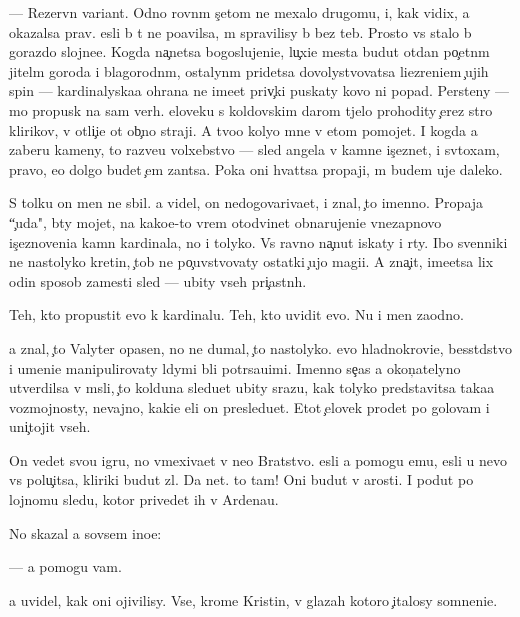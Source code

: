 \documentclass[10pt]{book}
\begin{document}
— Rezervn{\yi}{\y} variant. Odno rovn{\yi}m s{\c}etom ne mexalo drugomu, i, kak vidix, {\y}a okazalsa prav. {\Y}esli b{\yi} t{\yi} ne po{\y}avilsa, m{\yi} spravilisy b{\yi} bez teb{\ia}. Prosto vs{\e} stalo b{\yi} gorazdo slojne{\y}e. Kogda na{\c}netsa bogoslujeni{\y}e, lu{\c}xi{\y}e mesta budut otdan{\yi} po{\c}etn{\yi}m jitel{\ia}m goroda i blagorodn{\yi}m, ostalyn{\yi}m pridetsa dovolystvovatsa li{\q}ezreni{\y}em {\c}ujih spin — kardinalyska{\y}a ohrana ne ime{\y}et priv{\yi}{\c}ki puskaty kovo ni popad{\ia}. Persteny — mo{\y} propusk na sam{\yi}{\y} verh. {\C}eloveku s koldovskim darom t{\ia}jelo prohodity {\c}erez stro{\y} klirikov, v otli{\c}i{\y}e ot ob{\yi}{\c}no{\y} straji. A tvo{\y}o koly{\q}o mne v etom pomojet. I kogda {\y}a zaberu kameny, to razve{\y}u volxebstvo — sled angela v kamne is{\c}eznet, i sv{\ia}toxam, pravo, {\y}e{\x}o dolgo budet {\c}em zan{\ia}tsa. Poka oni hvat{\ia}tsa propaji, m{\yi} budem uje daleko.

S tolku on men{\ia} ne sbil. {\Y}a videl, on nedogovariva{\y}et, i znal, {\c}to imenno. Propaja ``{\c}uda", b{\yi}ty mojet, na kako{\y}e-to vrem{\ia} otodvinet obnarujeni{\y}e vnezapnovo is{\c}eznoveni{\y}a kamn{\ia} kardinala, no i tolyko. Vs{\e} ravno na{\c}nut iskaty i r{\yi}ty. Ibo sv{\ia}{\x}enniki ne nastolyko kretin{\yi}, {\c}tob{\yi} ne po{\c}uvstvovaty ostatki {\c}ujo{\y} magi{\y}i. A zna{\c}it, ime{\y}etsa lix odin sposob zamesti sled{\yi} — ubity vseh pri{\c}astn{\yi}h.

Teh, kto propustit {\y}evo k kardinalu. Teh, kto uvidit {\y}evo. Nu i men{\ia} zaodno.

{\Y}a znal, {\c}to Valyter opasen, no ne dumal, {\c}to nastolyko. {\Y}evo hladnokrovi{\y}e, besst{\yi}dstvo i umeni{\y}e manipulirovaty l{\iu}dymi b{\yi}li potr{\ia}sa{\y}u{\x}imi. Imenno se{\y}{\c}as {\y}a okon{\c}atelyno utverdilsa v m{\yi}sli, {\c}to kolduna sledu{\y}et ubity srazu, kak tolyko predstavitsa taka{\y}a vozmojnosty, nevajno, kaki{\y}e {\q}eli on presledu{\y}et. Etot {\c}elovek pro{\y}det po golovam i uni{\c}tojit vseh.

On vedet svo{\y}u igru, no vmexiva{\y}et v ne{\y}o Bratstvo. {\Y}esli {\y}a pomogu {\y}emu, {\y}esli u nevo vs{\e} polu{\c}itsa, kliriki budut zl{\yi}. Da net. {\C}to tam! Oni budut v {\y}arosti. I po{\y}dut po lojnomu sledu, kotor{\yi}{\y} privedet ih v Ardenau.

No skazal {\y}a sovsem ino{\y}e:

— {\Y}a pomogu vam.

{\Y}a uvidel, kak oni ojivilisy. Vse, krome Kristin{\yi}, v glazah kotoro{\y} {\c}italosy somneni{\y}e.
\end{document}
